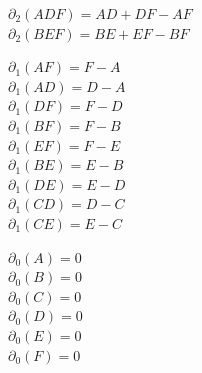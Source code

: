 \documentclass{article}
\begin{document}
\begin{enumerate}[label*=\alph*)]
    $\partial_2(ADF) = AD + DF - AF$\\
    $\partial_2(BEF) = BE + EF - BF$
    
    $\partial_1(AF) = F - A$\\
    $\partial_1(AD) = D - A$\\
    $\partial_1(DF) = F - D$\\
    $\partial_1(BF) = F - B$\\
    $\partial_1(EF) = F - E$\\
    $\partial_1(BE) = E - B$\\
    $\partial_1(DE) = E - D$\\
    $\partial_1(CD) = D - C$\\
    $\partial_1(CE) = E - C$
    
    $\partial_0(A) = 0$\\
    $\partial_0(B) = 0$\\
    $\partial_0(C) = 0$\\
    $\partial_0(D) = 0$\\
    $\partial_0(E) = 0$\\
    $\partial_0(F) = 0$


\end{enumerate}
\end{document}
